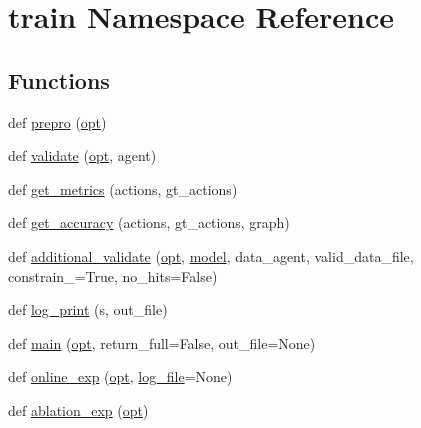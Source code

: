 \hypertarget{namespacetrain}{}\section{train Namespace Reference}
\label{namespacetrain}
\subsection*{Functions}
\begin{DoxyCompactItemize}
\item 
def \hyperlink{namespacetrain_a69347e6c50429f5076c376b70b1d8a27}{prepro} (\hyperlink{namespacetrain_a8ce47f3ce85e34ed945573b80e08aaf6}{opt})
\item 
def \hyperlink{namespacetrain_a339ec8fa7ecbd096bb08716bd0b2aa94}{validate} (\hyperlink{namespacetrain_a8ce47f3ce85e34ed945573b80e08aaf6}{opt}, agent)
\item 
def \hyperlink{namespacetrain_ad644487baaf3b94d8a6b32b0f6e88e15}{get\+\_\+metrics} (actions, gt\+\_\+actions)
\item 
def \hyperlink{namespacetrain_a55c2b31c8e13b7aa621b3954392bdb93}{get\+\_\+accuracy} (actions, gt\+\_\+actions, graph)
\item 
def \hyperlink{namespacetrain_a9719cda8ba718637950ea11259aa636c}{additional\+\_\+validate} (\hyperlink{namespacetrain_a8ce47f3ce85e34ed945573b80e08aaf6}{opt}, \hyperlink{namespacetrain_a943b3c8a55b8e52ba14f9b59e14840d2}{model}, data\+\_\+agent, valid\+\_\+data\+\_\+file, constrain\+\_\+=True, no\+\_\+hits=False)
\item 
def \hyperlink{namespacetrain_a2322df3364c6be0dfcbd3d13d9a4745e}{log\+\_\+print} (s, out\+\_\+file)
\item 
def \hyperlink{namespacetrain_a6e1c17af3a14f1cd1b54ee54ccf5a77b}{main} (\hyperlink{namespacetrain_a8ce47f3ce85e34ed945573b80e08aaf6}{opt}, return\+\_\+full=False, out\+\_\+file=None)
\item 
def \hyperlink{namespacetrain_ae2ba29fb97dfcb37d81039ba8e7d8580}{online\+\_\+exp} (\hyperlink{namespacetrain_a8ce47f3ce85e34ed945573b80e08aaf6}{opt}, \hyperlink{namespacetrain_a30cb844466eb30a5ba783789c8c0f43f}{log\+\_\+file}=None)
\item 
def \hyperlink{namespacetrain_a425ccbcfa57820b4ad788f4c71772f0f}{ablation\+\_\+exp} (\hyperlink{namespacetrain_a8ce47f3ce85e34ed945573b80e08aaf6}{opt})
\end{DoxyCompactItemize}
